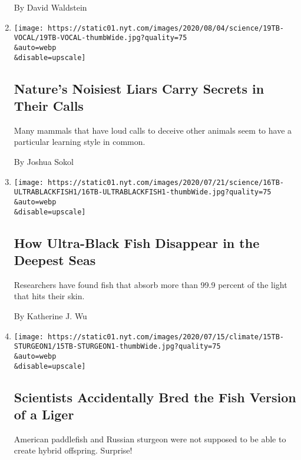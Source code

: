 \begin{enumerate}
  By David Waldstein
\item
  \href{/2020/07/21/science/mammals-vocal-learning.html}{}

  \texttt{[image: https://static01.nyt.com/images/2020/08/04/science/19TB-VOCAL/19TB-VOCAL-thumbWide.jpg?quality=75\\\&auto=webp\\\&disable=upscale]}

  \hypertarget{natures-noisiest-liars-carry-secrets-in-their-calls}{%
  \subsection{Nature's Noisiest Liars Carry Secrets in Their
  Calls}\label{natures-noisiest-liars-carry-secrets-in-their-calls}}

  Many mammals that have loud calls to deceive other animals seem to
  have a particular learning style in common.

  By Joshua Sokol
\item
  \href{/2020/07/16/science/ultra-black-fish.html}{}

  \texttt{[image: https://static01.nyt.com/images/2020/07/21/science/16TB-ULTRABLACKFISH1/16TB-ULTRABLACKFISH1-thumbWide.jpg?quality=75\\\&auto=webp\\\&disable=upscale]}

  \hypertarget{how-ultra-black-fish-disappear-in-the-deepest-seas}{%
  \subsection{How Ultra-Black Fish Disappear in the Deepest
  Seas}\label{how-ultra-black-fish-disappear-in-the-deepest-seas}}

  Researchers have found fish that absorb more than 99.9 percent of the
  light that hits their skin.

  By Katherine J. Wu
\item
  \href{/2020/07/15/science/hybrid-sturgeon-paddlefish.html}{}

  \texttt{[image: https://static01.nyt.com/images/2020/07/15/climate/15TB-STURGEON1/15TB-STURGEON1-thumbWide.jpg?quality=75\\\&auto=webp\\\&disable=upscale]}

  \hypertarget{scientists-accidentally-bred-the-fish-version-of-a-liger}{%
  \subsection{Scientists Accidentally Bred the Fish Version of a
  Liger}\label{scientists-accidentally-bred-the-fish-version-of-a-liger}}

  American paddlefish and Russian sturgeon were not supposed to be able
  to create hybrid offspring. Surprise!


\end{enumerate}
